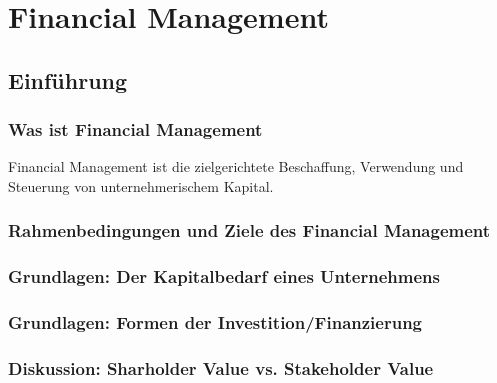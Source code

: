 \chapter{Financial Management}

\section{Einführung}

\subsection{Was ist Financial Management}
Financial Management ist die zielgerichtete Beschaffung, Verwendung und Steuerung von unternehmerischem Kapital.


\subsection{Rahmenbedingungen und Ziele des Financial Management}

\subsection{Grundlagen: Der Kapitalbedarf eines Unternehmens}

\subsection{Grundlagen: Formen der Investition/Finanzierung}

\subsection{Diskussion: Sharholder Value vs. Stakeholder Value}